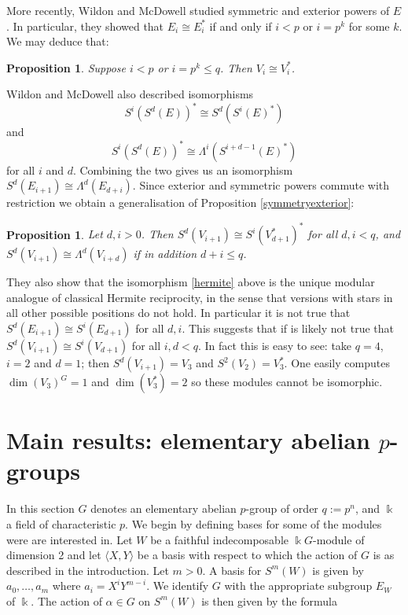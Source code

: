 \documentclass[a4paper]{amsart}
\newcommand{\kk}{\Bbbk}
\newtheorem{Proposition}[Lemma]{Proposition}
\theoremstyle{definition}
\theoremstyle{remark}
\theoremstyle{Acknowledgments}
\begin{document}
More recently, Wildon and McDowell \cite{WildonMcDowell} studied symmetric and exterior powers of $E$. In particular, they showed that $E_i \cong E_i^*$ if and only if $i<p$ or $i=p^k$ for some $k$. We may deduce that:
\begin{Proposition}\label{self-dual}
Suppose $i<p$ or $i=p^k \leq q$. Then $V_i \cong V_i^*$.
 \end{Proposition}
Wildon and McDowell also described isomorphisms
 \begin{equation}\label{hermite} S^i(S^{d}(E))^* \cong S^d(S^i(E)^*)
\end{equation} and \[S^i(S^{d}(E))^* \cong \Lambda^i(S^{i+d-1}(E)^*)\] for all $i$ and $d$. Combining the two gives us an isomorphism $S^d(E_{i+1}) \cong \Lambda^d(E_{d+i})$. 
Since exterior and symmetric powers commute with restriction we obtain a generalisation of Proposition \ref{symmetryexterior}:
\begin{Proposition}\label{wildon}
Let $d,i>0$. Then  $S^d(V_{i+1}) \cong S^i(V_{d+1}^*)^*$ for all $d,i < q$, and $S^d(V_{i+1})  \cong \Lambda^d(V_{i+d})$ if in addition $d+i \leq q$.
\end{Proposition}
They also show that the isomorphism \eqref{hermite} above is the unique modular analogue of classical Hermite reciprocity, in the sense that versions with stars in all other possible positions do not hold. In particular it is not true that $S^d(E_{i+1}) \cong S^i(E_{d+1})$ for all $d, i$. This suggests that if is likely not true that $S^d(V_{i+1}) \cong S^i(V_{d+1})$ for all $i,d<q$. In fact this is easy to see: take $q=4$, $i=2$ and $d=1$; then $S^d(V_{i+1}) = V_3$ and $S^2(V_2) = V_3^*$. One easily computes $\dim(V_3)^G=1$ and $\dim(V_3^*)=2$ so these modules cannot be isomorphic.

\section{Main results: elementary abelian $p$-groups}

In this section $G$ denotes an elementary abelian $p$-group of order $q:=p^n$, and $\kk$ a field of characteristic $p$.
We begin by defining bases for some of the modules were are interested in. Let $W$ be a faithful indecomposable $\kk G$-module of dimension 2 and let $\langle X,Y \rangle$ be a basis with respect to which the action of $G$ is as described in the introduction. Let $m>0$. A basis for $S^m(W)$ is given by $a_0, \ldots, a_m$ where $a_i = X^iY^{m-i}$. We identify $G$ with the appropriate subgroup $E_W$ of $\kk$. The action of $\alpha \in G$ on $S^m(W)$ is then given by the formula
\end{document}
